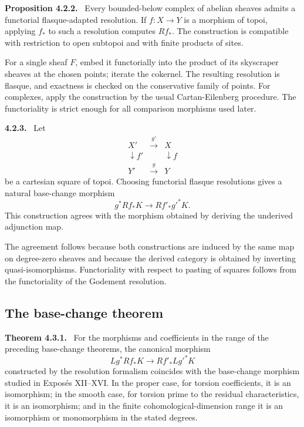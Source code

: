 \documentclass[12pt]{article}
\newenvironment{statement}[1]{\par\medskip\noindent\textbf{#1.}\ }{\par\medskip}
\begin{document}
\begin{statement}{Proposition 4.2.2}
Every bounded-below complex of abelian sheaves admits a functorial flasque-adapted resolution. If \(f:X\to Y\) is a morphism of topoi, applying \(f_*\) to such a resolution computes \(Rf_*\). The construction is compatible with restriction to open subtopoi and with finite products of sites.
\end{statement}

For a single sheaf \(F\), embed it functorially into the product of its skyscraper sheaves at the chosen points; iterate the cokernel. The resulting resolution is flasque, and exactness is checked on the conservative family of points. For complexes, apply the construction by the usual Cartan-Eilenberg procedure. The functoriality is strict enough for all comparison morphisms used later.

\begin{statement}{4.2.3}
Let
\[
\begin{array}{ccc}
X'&\xrightarrow{g'}&X\\
\downarrow f'&&\downarrow f\\
Y'&\xrightarrow{g}&Y
\end{array}
\]
be a cartesian square of topoi. Choosing functorial flasque resolutions gives a natural base-change morphism
\[
g^*Rf_*K\to Rf'_*g'^*K.
\]
This construction agrees with the morphism obtained by deriving the underived adjunction map.
\end{statement}

The agreement follows because both constructions are induced by the same map on degree-zero sheaves and because the derived category is obtained by inverting quasi-isomorphisms. Functoriality with respect to pasting of squares follows from the functoriality of the Godement resolution.

\subsection{The base-change theorem}

\begin{statement}{Theorem 4.3.1}
For the morphisms and coefficients in the range of the preceding base-change theorems, the canonical morphism
\[
Lg^*Rf_*K\longrightarrow Rf'_*Lg'^*K
\]
constructed by the resolution formalism coincides with the base-change morphism studied in Expos\'es XII--XVI. In the proper case, for torsion coefficients, it is an isomorphism; in the smooth case, for torsion prime to the residual characteristics, it is an isomorphism; and in the finite cohomological-dimension range it is an isomorphism or monomorphism in the stated degrees.
\end{statement}
\end{document}
